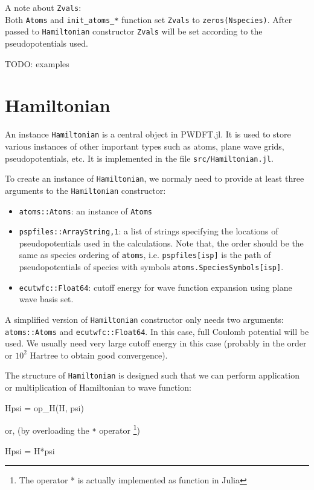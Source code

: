 \documentclass[a4paper,10pt,twocolumn]{paper}
\newcommand{\jlcode}[1]{\texttt{#1}}
\begin{document}
A note about \jlcode{Zvals}: \\
Both \jlcode{Atoms} and \jlcode{init_atoms_*} function set
\jlcode{Zvals} to \jlcode{zeros(Nspecies)}.
After passed to \jlcode{Hamiltonian} constructor
\jlcode{Zvals} will be set according to the pseudopotentials used.

TODO: examples

\section{Hamiltonian}

An instance \jlcode{Hamiltonian} is a central object in \textsf{PWDFT.jl}.
It is used to store various instances of other important types
such as atoms, plane wave grids, pseudopotentials, etc.
It is implemented in the file \texttt{src/Hamiltonian.jl}.

To create an instance of \jlcode{Hamiltonian}, we normaly need to provide at least
three arguments to the \jlcode{Hamiltonian} constructor:
%
\begin{itemize}
%
\item \jlcode{atoms::Atoms}: an instance of \jlcode{Atoms}
%
\item \jlcode{pspfiles::Array{String,1}}: a list of strings specifying the
  locations of pseudopotentials used in the
  calculations. Note that, the order should be the same as species ordering
  of \jlcode{atoms}, i.e. \jlcode{pspfiles[isp]} is the path of
  pseudopotentials of species with symbols \jlcode{atoms.SpeciesSymbols[isp]}.
%
\item \jlcode{ecutwfc::Float64}: cutoff energy for wave function
  expansion using plane wave basis set.
\end{itemize}

A simplified version of \jlcode{Hamiltonian} constructor only needs two arguments:
\jlcode{atoms::Atoms} and \jlcode{ecutwfc::Float64}. In this case, full Coulomb potential
will be used. We usually need very large cutoff energy in this case (probably
in the order or $10^2$ Hartree to obtain good convergence).

The structure of \jlcode{Hamiltonian} is designed such that we can perform
application or multiplication of Hamiltonian to wave function:
%
\begin{juliacode}
Hpsi = op_H(H, psi)
\end{juliacode}
%
or, (by overloading the \jlcode{*} operator
\footnote{The operator * is actually implemented as function in Julia})
%
\begin{juliacode}
Hpsi = H*psi
\end{juliacode}
\end{document}
